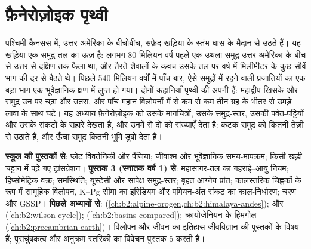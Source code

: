 \chapter{फ़ैनेरोज़ोइक पृथ्वी}\label{ch:b2:phanerozoic-earth}

पश्चिमी कैनसस में, उत्तर अमेरिका के बीचोबीच, सफ़ेद खड़िया के स्तंभ घास के मैदान से उठते हैं।
यह खड़िया एक समुद्र-तल का ऊज़ है: लगभग 80 मिलियन वर्ष पहले एक
उथला समुद्र उत्तर अमेरिका के बीच से उत्तर से दक्षिण तक फैला था, और तैरते शैवालों के कवच
उसके तल पर वर्ष में मिलीमीटर के कुछ सौवें भाग की दर से बैठते थे। पिछले 540 मिलियन वर्षों में पाँच बार,
ऐसे समुद्रों में रहने वाली प्रजातियों का एक बड़ा भाग एक भूवैज्ञानिक क्षण में लुप्त हो गया।
दोनों कहानियाँ पृथ्वी की अपनी हैं: महाद्वीप खिसके और समुद्र उन पर चढ़ा और उतरा,
और पाँच महान विलोपनों में से कम से कम तीन ग्रह के भीतर से उमड़े लावा के साथ घटे।
यह अध्याय फ़ैनेरोज़ोइक को उसके मानचित्रों, उसके समुद्र-स्तर, उसकी पर्वत-पट्टियों
और उसके संकटों के सहारे देखता है, और उनमें से दो को संख्याएँ देता है: कटक समुद्र को कितनी तेज़ी से उठाते हैं, और
ऊँचा समुद्र कितनी भूमि डुबो देता है।

\begin{recall}
\textbf{स्कूल की पुस्तकों से}: प्लेट विवर्तनिकी और पैंजिया; जीवाश्म और भूवैज्ञानिक समय-मापक्रम;
किसी खड़ी चट्टान में पढ़े गए ट्रांसग्रेशन। \textbf{पुस्तक 3 (स्नातक वर्ष 1) से}: महासागर-तल का गहराई--आयु
नियम; हिप्सोमेट्रिक वक्र; समस्थिति; यूस्टेसी और सापेक्ष समुद्र-स्तर; बृहत आग्नेय
प्रांत; कालस्तरिक चिह्नकों के रूप में सामूहिक विलोपन, K--Pg सीमा का इरिडियम और
पर्मियन-अंत संकट का काल-निर्धारण; चरण और GSSP। \textbf{पिछले अध्यायों से}: 
(\cref{ch:b2:alpine-orogen,ch:b2:himalaya-andes});  और 
(\cref{ch:b2:wilson-cycle});  (\cref{ch:b2:basins-compared}); क्रायोजेनियन के
हिमगोल (\cref{ch:b2:precambrian-earth})। विलोपन और जीवन का इतिहास जीवविज्ञान की पुस्तकों
के विषय हैं; पुराचुंबकत्व और अनुक्रम स्तरिकी का विवेचन पुस्तक 5 करती है।
\end{recall}

